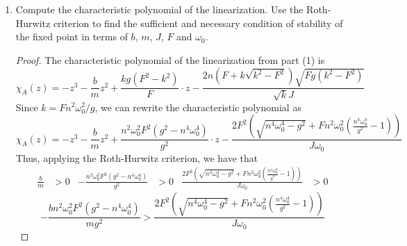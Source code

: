 \documentclass[../psets.tex]{subfiles}
\begin{document}
\begin{enumerate}
\begin{enumerate}
\begin{proof}
            \begin{equation*}
                \boxed{A = {
                    \begin{pNiceMatrix}
                        0 & 1 & 0\\
                        \frac{gk(F^2-k^2)}{F} & -\frac{b}{m} & 2n\sqrt{\frac{gF(k^2-F^2)}{k}}\\
                        -\frac{1}{J}(k\sqrt{k^2-F^2}+F) & 0 & 0\\
                    \end{pNiceMatrix}
                }}
            \end{equation*}
        \end{proof}
        \item Compute the characteristic polynomial of the linearization. Use the Roth-Hurwitz criterion to find the sufficient and necessary condition of stability of the fixed point in terms of $b$, $m$, $J$, $F$ and $\omega_0$.
        \begin{proof}
            The characteristic polynomial of the linearization from part (1) is
            \begin{equation*}
                \boxed{\chi_A(z) = -z^3-\frac{b}{m}z^2+\frac{kg(F^2-k^2)}{F}\cdot z-\frac{2n(F+k\sqrt{k^2-F^2})\sqrt{Fg(k^2-F^2)}}{\sqrt{k}J}}
            \end{equation*}
            Since $k=Fn^2\omega_0^2/g$, we can rewrite the characteristic polynomial as
            \begin{equation*}
                \chi_A(z) = -z^3-\frac{b}{m}z^2+\frac{n^2\omega_0^2F^2(g^2-n^4\omega_0^4)}{g^2}\cdot z-\frac{2F^2(\sqrt{n^4\omega_0^4-g^2}+Fn^2\omega_0^2(\frac{n^4\omega_0^4}{g^2}-1))}{J\omega_0}
            \end{equation*}
            Thus, applying the Roth-Hurwitz criterion, we have that
            \begin{align*}
                \frac{b}{m} &> 0&
                -\frac{n^2\omega_0^2F^2(g^2-n^4\omega_0^4)}{g^2} &> 0&
                \frac{2F^2(\sqrt{n^4\omega_0^4-g^2}+Fn^2\omega_0^2(\frac{n^4\omega_0^4}{g^2}-1))}{J\omega_0} &> 0
            \end{align*}
            \begin{equation*}
                -\frac{bn^2\omega_0^2F^2(g^2-n^4\omega_0^4)}{mg^2} > \frac{2F^2(\sqrt{n^4\omega_0^4-g^2}+Fn^2\omega_0^2(\frac{n^4\omega_0^4}{g^2}-1))}{J\omega_0}
            \end{equation*}
        \end{proof}

\end{enumerate}
\end{enumerate}
\end{document}
